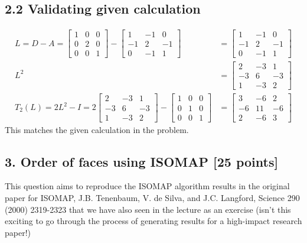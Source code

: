 \documentclass[twoside,10pt]{article}
\begin{document}
\begin{enumerate}[label=(\arabic*)]
    \subsection*{2.2 Validating given calculation}
    \begin{align*}
    L = D-A = \begin{bmatrix}1&0&0 \\0&2&0 \\0&0&1\end{bmatrix} - \begin{bmatrix}1&-1&0 \\-1&2&-1 \\0&-1&1 \end{bmatrix} &= \begin{bmatrix}1&-1&0 \\-1&2&-1 \\0&-1&1 \end{bmatrix} \\
    L^2 &=\begin{bmatrix}2&-3&1\\-3&6&-3\\1&-3&2\end{bmatrix} \\
    T_2(L)=2L^2-I= 2\begin{bmatrix}2&-3&1\\-3&6&-3\\1&-3&2\end{bmatrix}-\begin{bmatrix}1&0&0\\0&1&0\\0&0&1\end{bmatrix} &=\begin{bmatrix}3&-6&2\\-6&11&-6\\2&-6&3\end{bmatrix}
\end{align*}
This matches the given calculation in the problem.
\end{enumerate}


\subsection*{3. Order of faces using ISOMAP [25 points]}

This question aims to reproduce the ISOMAP algorithm results in the original paper for ISOMAP, J.B. Tenenbaum, V. de Silva, and J.C. Langford, Science 290 (2000) 2319-2323 that we have also seen in the lecture as an exercise (isn't this exciting to go through the process of generating results for a high-impact research paper!) 
\end{document}
